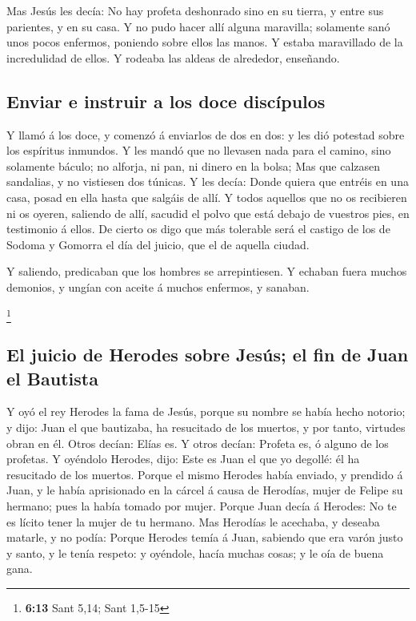  Mas Jesús les decía: No hay profeta deshonrado sino en su
tierra, y entre sus parientes, y en su casa.  Y no pudo
hacer allí alguna maravilla; solamente sanó unos pocos enfermos,
poniendo sobre ellos las manos.  Y estaba maravillado de la
incredulidad de ellos. Y rodeaba las aldeas de alrededor, enseñando.

\hypertarget{enviar-e-instruir-a-los-doce-discuxedpulos}{%
\subsection{Enviar e instruir a los doce
discípulos}\label{enviar-e-instruir-a-los-doce-discuxedpulos}}

 Y llamó á los doce, y comenzó á enviarlos de dos en dos: y
les dió potestad sobre los espíritus inmundos.  Y les mandó
que no llevasen nada para el camino, sino solamente báculo; no alforja,
ni pan, ni dinero en la bolsa;  Mas que calzasen sandalias,
y no vistiesen dos túnicas.  Y les decía: Donde quiera que
entréis en una casa, posad en ella hasta que salgáis de allí.
 Y todos aquellos que no os recibieren ni os oyeren,
saliendo de allí, sacudid el polvo que está debajo de vuestros pies, en
testimonio á ellos. De cierto os digo que más tolerable será el castigo
de los de Sodoma y Gomorra el día del juicio, que el de aquella ciudad.

 Y saliendo, predicaban que los hombres se arrepintiesen.
 Y echaban fuera muchos demonios, y ungían con aceite á
muchos enfermos, y sanaban.

\footnote{\textbf{6:13} Sant 5,14; Sant 1,5-15}

\hypertarget{el-juicio-de-herodes-sobre-jesuxfas-el-fin-de-juan-el-bautista}{%
\subsection{El juicio de Herodes sobre Jesús; el fin de Juan el
Bautista}\label{el-juicio-de-herodes-sobre-jesuxfas-el-fin-de-juan-el-bautista}}

 Y oyó el rey Herodes la fama de Jesús, porque su nombre se
había hecho notorio; y dijo: Juan el que bautizaba, ha resucitado de los
muertos, y por tanto, virtudes obran en él.  Otros decían:
Elías es. Y otros decían: Profeta es, ó alguno de los profetas.
 Y oyéndolo Herodes, dijo: Este es Juan el que yo degollé:
él ha resucitado de los muertos.  Porque el mismo Herodes
había enviado, y prendido á Juan, y le había aprisionado en la cárcel á
causa de Herodías, mujer de Felipe su hermano; pues la había tomado por
mujer.  Porque Juan decía á Herodes: No te es lícito tener
la mujer de tu hermano.  Mas Herodías le acechaba, y
deseaba matarle, y no podía:  Porque Herodes temía á Juan,
sabiendo que era varón justo y santo, y le tenía respeto: y oyéndole,
hacía muchas cosas; y le oía de buena gana.

